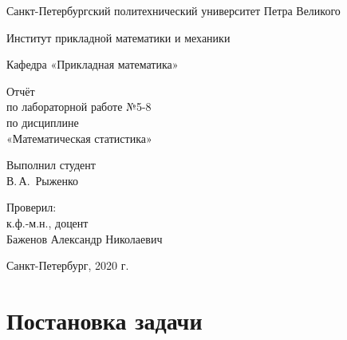 \documentclass[12pt,a4paper]{scrartcl}
\begin{document}
\begin{titlepage}
  \begin{center}

    Санкт-Петербургский политехнический университет Петра Великого

    \vspace{0.25cm}
    
    Институт прикладной математики и механики
    
    Кафедра «Прикладная математика»
    \vfill

	\vspace{0.25cm}
	    Отчёт\\
	по лабораторной работе №5-8\\
	по дисциплине\\
	«Математическая статистика»

  \bigskip

\end{center}
\vfill

\newlength{\ML}
\hfill\begin{minipage}{0.4\textwidth}
  Выполнил студент\\ В.\,А.~Рыженко\\
\end{minipage}%
\bigskip

\hfill\begin{minipage}{0.4\textwidth}
  Проверил:\\
к.ф.-м.н., доцент\\
Баженов Александр Николаевич\\
\end{minipage}%
\vfill

\begin{center}
  Санкт-Петербург, 2020 г.
\end{center}
\end{titlepage}

\tableofcontents
\listoffigures
\listoftables
\newpage

\section{Постановка задачи}
\end{document}
